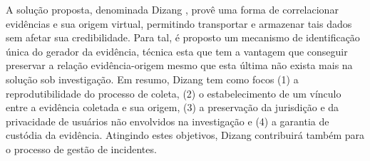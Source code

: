 \documentclass[a4paper,capchap,espacoduplo,normaltoc]{abntepusp}
\newcommand{\fancyname}{Dizang }
\begin{document}
\begin{resumo}
%
A solução proposta, denominada \fancyname, provê uma forma de correlacionar evidências e sua origem virtual, permitindo transportar e armazenar tais dados sem afetar sua credibilidade.
%
Para tal, é proposto um mecanismo de identificação única do gerador da evidência, técnica esta que tem a vantagem que conseguir preservar a relação evidência-origem mesmo que esta última não exista mais na solução sob investigação. %
%
Em resumo, \fancyname tem como focos (1) a reprodutibilidade do processo de coleta, (2) o estabelecimento de um vínculo entre a evidência coletada e sua origem, (3) a preservação da jurisdição e da privacidade de usuários não envolvidos na investigação e (4) a garantia de custódia da evidência.
%
Atingindo estes objetivos, \fancyname contribuirá também para o processo de gestão de incidentes.
\end{resumo}
\end{document}
